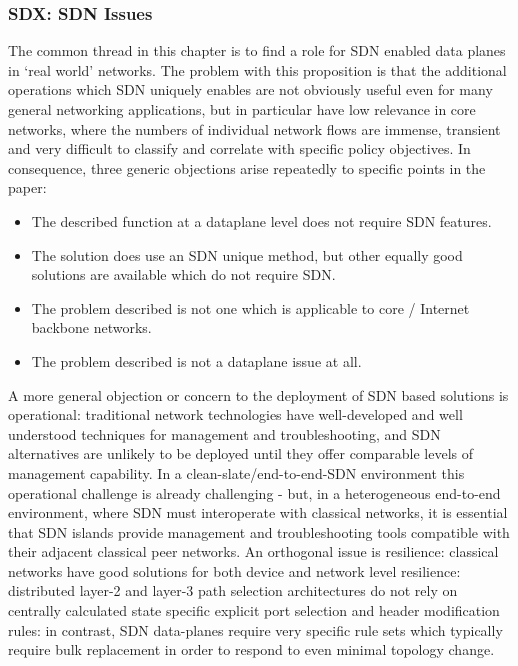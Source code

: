 \subsubsection{SDX: SDN Issues}
The common thread in this
chapter is to find a role for SDN enabled data planes in `real world' networks.
The problem with this proposition is that the additional operations which SDN uniquely enables are not obviously useful even for many general networking applications, but in particular have low relevance in core networks, where the numbers of individual network flows are immense, transient and very difficult to classify and correlate with specific policy objectives.
In consequence, three generic objections arise repeatedly to specific points in the paper:
\begin{itemize}[noitemsep,nolistsep]
	\item{The described function at a dataplane level does not require SDN features.}
	\item{The solution does use an SDN unique method, but other equally good solutions are available which do not require SDN.}
	\item{The problem described is not one which is applicable to core / Internet backbone networks.}
	\item{The problem described is not a dataplane issue at all.}
\end{itemize}
A more general objection or concern to the deployment of SDN based solutions is operational: traditional network technologies have well-developed and well understood techniques for management and troubleshooting, and SDN alternatives are unlikely to be deployed until they offer comparable levels of management capability.
In a clean-slate/end-to-end-SDN environment this operational challenge is already challenging -  but, in a heterogeneous end-to-end environment, where SDN must interoperate with classical networks, it is essential that SDN islands provide management and troubleshooting tools compatible with their adjacent classical peer networks.
An orthogonal issue is resilience: classical networks have good solutions for both device and network level resilience: distributed layer-2 and layer-3 path selection architectures do not rely on centrally calculated state specific explicit port selection and header modification rules: in contrast, SDN data-planes require very specific rule sets which typically require bulk replacement in order to respond to even minimal topology change.

